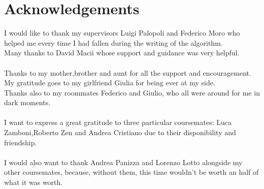 \chapter*{Acknowledgements}
\thispagestyle{empty}

I would like to thank my supervisors Luigi Palopoli and Federico Moro who helped me every time I had fallen during the writing of the algorithm.
\\
Many thanks to David Macii whose support and guidance was very helpful.
\\ \\
Thanks to my mother,brother and aunt for all the support and encouragement.
\\
My gratitude goes to my girlfriend Giulia for being ever at my side.
\\
Thanks also to my roommates Federico and Giulio, who all were around for me in dark moments.
\\ \\ 
I want to express a great gratitude to three particular coursemates: Luca Zamboni,Roberto Zen and Andrea Cristiano due to their disponibility and friendship.
\\ \\
I would also want to thank Andrea Panizza and Lorenzo Lotto alongside my other coursemates, because, without them, this time wouldn't be worth an half of what it was worth.

